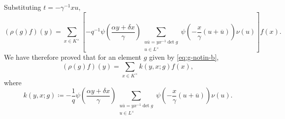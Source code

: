 \documentclass[../main.tex]{subfiles}
\begin{document}
Substituting $t=-\gamma^{-1}xu$,
\[(\rho(g)f)(y)=\sum_{x\in K^\times}\left[-q^{-1}\psi\left(\frac{\alpha y+\delta x}\gamma\right)\sum_{\substack{u\overline u=yx^{-1}\det g\\u\in L^\times}}\psi\left(-\frac x\gamma(u+\overline u)\right)\nu(u)\right]f(x).\]
We have therefore proved that for an element $g$ given by \eqref{eq:g-notin-b},
\begin{equation}
	(\rho(g)f)(y)=\sum_{x\in K^\times}k(y,x;g)f(x), \label{eq:general-cuspidal-def}
\end{equation}
where
\begin{equation}
	k(y,x;g)\coloneqq-\frac1q\psi\left(\frac{\alpha y+\delta x}\gamma\right)\sum_{\substack{u\overline u=yx^{-1}\det g\\u\in L^\times}}\psi\left(-\frac x\gamma(u+\overline u)\right)\nu(u). \label{eq:general-cuspidal-matrix}
\end{equation}
\end{document}

